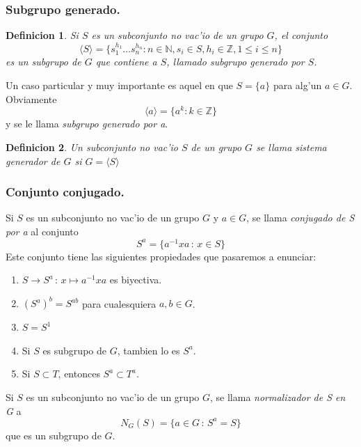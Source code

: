 \documentclass[a4paper,openright,12pt]{report}
\numberwithin{equation}{section} %
\newtheorem{definicion}{Definicion}[section] %
\begin{document}
\subsubsection{Subgrupo generado.}
\begin{definicion}
Si $S$ es un subconjunto no vac'io de un grupo $G$, el conjunto
\[
\langle S \rangle = \{s_{1}^{h_{1}}\ldots s_{n}^{h_{n}}:n\in \mathbb{N},s_{i}\in S,h_{i}\in \mathbb{Z}, 1 \le i \le n \}
\]
es un subgrupo de $G$ que contiene a $S$, llamado subgrupo generado por $S$.
\end{definicion}
Un caso particular y muy importante es aquel en que $S=\{a\}$ para alg'un $a \in G$. Obviamente
\[
\langle a \rangle = \{a^{k}:k \in \mathbb{Z} \}
\]
y se le llama \textit{subgrupo generado por a}.
\begin{definicion}
Un subconjunto no vac'io $S$ de un grupo $G$ se llama sistema generador de $G$ si $G=\langle S \rangle$
\end{definicion}
\subsubsection{Conjunto conjugado.}
Si $S$ es un subconjunto no vac'io de un grupo $G$ y $a \in G$, se llama \textit{conjugado de S por a} al conjunto
\[
S^{a}=\{a^{-1}xa\,:\,x\in S  \}
\]
Este conjunto tiene las siguientes propiedades que pasaremos a enunciar:
\begin{enumerate}
\item $S \rightarrow S^{a} \,:\, x\mapsto a^{-1}xa$ es biyectiva.
\item $(S^{a})^{b}=S^{ab}$ para cualesquiera $a,b \in G$.
\item $S=S^{1}$
\item Si $S$ es subgrupo de $G$, tambien lo es $S^{a}$.
\item Si $S \subset T$, entonces $S^{a} \subset T^{a}$.
\end{enumerate}
Si $S$ es un subconjunto no vac'io de un grupo $G$, se llama \textit{normalizador de S en G} a 
\[
N_{G}(S) = \{a \in G \,:\, S^{a}=S \}
\]
que es un subgrupo de $G$.
\end{document}

